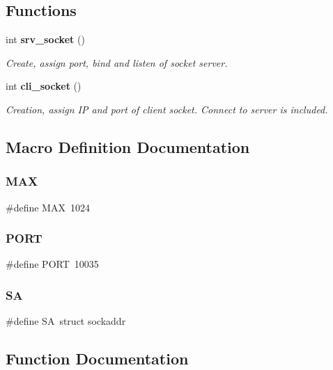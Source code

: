 \subsection*{Functions}
\begin{DoxyCompactItemize}
\item 
int \textbf{ srv\+\_\+socket} ()
\begin{DoxyCompactList}\small\item\em Create, assign port, bind and listen of socket server. \end{DoxyCompactList}\item 
int \textbf{ cli\+\_\+socket} ()
\begin{DoxyCompactList}\small\item\em Creation, assign IP and port of client socket. Connect to server is included. \end{DoxyCompactList}\end{DoxyCompactItemize}


\subsection{Macro Definition Documentation}
\mbox{\label{socket_8h_a392fb874e547e582e9c66a08a1f23326}} 
\subsubsection{M\+AX}
{\footnotesize\ttfamily \#define M\+AX~1024}

\mbox{\label{socket_8h_a614217d263be1fb1a5f76e2ff7be19a2}} 
\subsubsection{P\+O\+RT}
{\footnotesize\ttfamily \#define P\+O\+RT~10035}

\mbox{\label{socket_8h_a1e43924adac4ae865aa0acf79710261c}} 
\subsubsection{SA}
{\footnotesize\ttfamily \#define SA~struct sockaddr}



\subsection{Function Documentation}
\mbox{\label{socket_8h_a9c129efbce40f3061d7899d2adf36a55}} 
